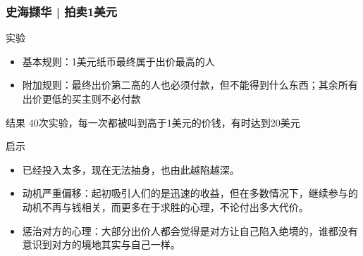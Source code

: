 \begin{frame}
  \frametitle{史海撷华 | 拍卖1美元}
  \begin{block}{实验}
    \begin{itemize}
      \item 基本规则：1美元纸币最终属于出价最高的人
      \item 附加规则：最终出价第二高的人也必须付款，但不能得到什么东西；其余所有出价更低的买主则不必付款
    \end{itemize}
  \end{block}
  \vspace{-0.5em}
  \pause
  \begin{block}{结果}
    40次实验，每一次都被叫到高于1美元的价钱，有时达到20美元
  \end{block}
  \vspace{-0.5em}
  \pause
  \begin{block}{启示}
    \begin{itemize}
      \item 已经投入太多，现在无法抽身，也由此越陷越深。
      \item 动机严重偏移：起初吸引人们的是迅速的收益，但在多数情况下，继续参与的动机不再与钱相关，而更多在于求胜的心理，不论付出多大代价。
      \item 惩治对方的心理：大部分出价人都会觉得是对方让自己陷入绝境的，谁都没有意识到对方的境地其实与自己一样。
    \end{itemize}
  \end{block}
\end{frame}

